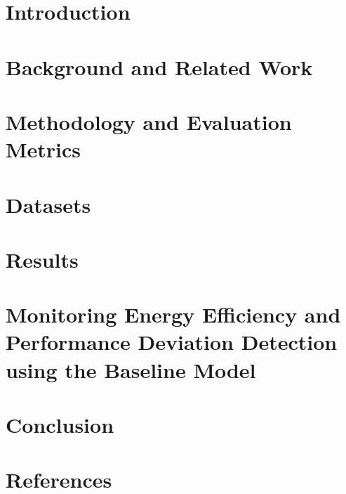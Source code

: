 \documentclass[12pt, letterpaper]{article}
\begin{document}


\tableofcontents
\pagebreak
\listoffigures
\listoftables

\pagebreak

\section{Introduction}

\pagebreak

\section{Background and Related Work}

\pagebreak

\section{Methodology and Evaluation Metrics}

\pagebreak

\section{Datasets}

\pagebreak

\section{Results}

\pagebreak

\section{Monitoring Energy Efficiency and Performance Deviation Detection using the Baseline Model}

\pagebreak

\section{Conclusion}

\pagebreak


\section{References}
\printbibliography[heading=none]
\pagebreak


%
\end{document}
